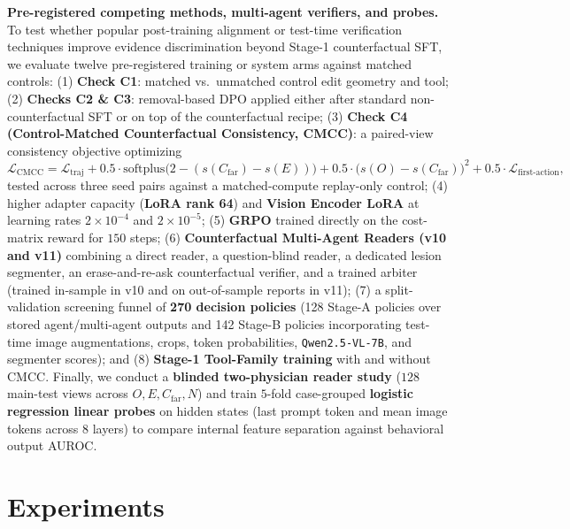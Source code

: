 \documentclass{article} %
\begin{document}
\textbf{Pre-registered competing methods, multi-agent verifiers, and probes.} To test whether popular post-training alignment or test-time verification techniques improve evidence discrimination beyond Stage-1 counterfactual SFT, we evaluate twelve pre-registered training or system arms against matched controls:
(1) \textbf{Check C1}: matched vs.\ unmatched control edit geometry and tool;
(2) \textbf{Checks C2 \& C3}: removal-based DPO \citep{rafailov2023dpo} applied either after standard non-counterfactual SFT or on top of the counterfactual recipe;
(3) \textbf{Check C4 (Control-Matched Counterfactual Consistency, CMCC)}: a paired-view consistency objective optimizing
\begin{equation}
\label{eq:cmcc}
\mathcal{L}_{\text{CMCC}} = \mathcal{L}_{\text{traj}} + 0.5 \cdot \text{softplus}\big(2 - (s(C_{\text{far}}) - s(E))\big) + 0.5 \cdot \big(s(O) - s(C_{\text{far}})\big)^2 + 0.5 \cdot \mathcal{L}_{\text{first-action}},
\end{equation}
tested across three seed pairs against a matched-compute replay-only control;
(4) higher adapter capacity (\textbf{LoRA rank 64}) and \textbf{Vision Encoder LoRA} at learning rates $2\times 10^{-4}$ and $2\times 10^{-5}$;
(5) \textbf{GRPO} \citep{shao2024deepseekmath} trained directly on the cost-matrix reward for $150$ steps;
(6) \textbf{Counterfactual Multi-Agent Readers (v10 and v11)} combining a direct reader, a question-blind reader, a dedicated lesion segmenter, an erase-and-re-ask counterfactual verifier, and a trained arbiter (trained in-sample in v10 and on out-of-sample reports in v11);
(7) a split-validation screening funnel of \textbf{270 decision policies} (128 Stage-A policies over stored agent/multi-agent outputs and 142 Stage-B policies incorporating test-time image augmentations, crops, token probabilities, \texttt{Qwen2.5-VL-7B}, and segmenter scores); and
(8) \textbf{Stage-1 Tool-Family training} with and without CMCC.
Finally, we conduct a \textbf{blinded two-physician reader study} ($128$ main-test views across $O, E, C_{\text{far}}, N$) and train $5$-fold case-grouped \textbf{logistic regression linear probes} \citep{alain2016understanding} on hidden states (last prompt token and mean image tokens across $8$ layers) to compare internal feature separation against behavioral output AUROC.

\section{Experiments}
\label{sec:experiments}
\end{document}

